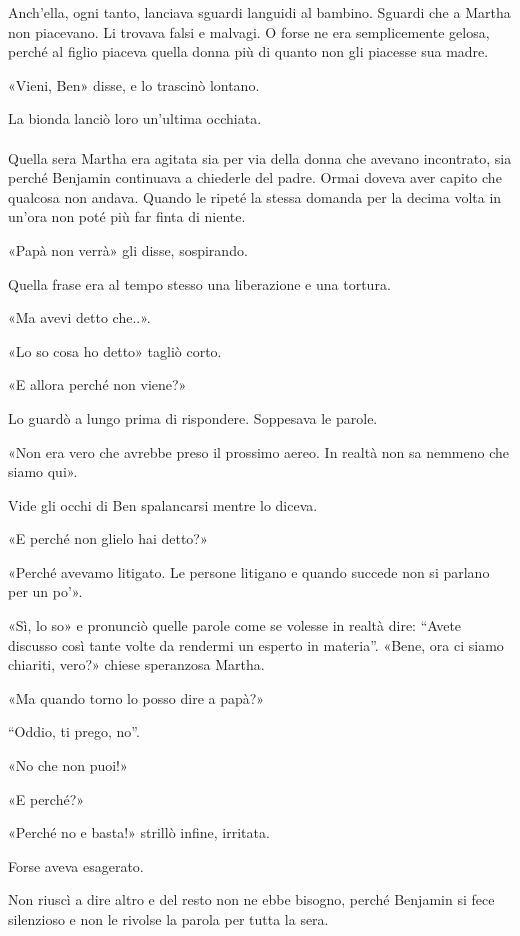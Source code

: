 \documentclass[a4paper,12pt]{book}
\begin{document}
Anch'ella, ogni tanto, lanciava sguardi languidi al bambino. Sguardi che a
Martha non piacevano. Li trovava falsi e malvagi. O forse ne era semplicemente
gelosa, perché al figlio piaceva quella donna più di quanto non gli piacesse
sua madre.

«Vieni, Ben» disse, e lo trascinò lontano.

La bionda lanciò loro un'ultima occhiata.

\paragraph{}
Quella sera Martha era agitata sia per via della donna che avevano incontrato,
sia perché Benjamin continuava a chiederle del padre. Ormai doveva aver capito
che qualcosa non andava. Quando le ripeté la stessa domanda per la decima volta
in un'ora non poté più far finta di niente.

«Papà non verrà» gli disse, sospirando.

Quella frase era al tempo stesso una liberazione e una tortura.

«Ma avevi detto che..».

«Lo so cosa ho detto» tagliò corto.

«E allora perché non viene?»

Lo guardò a lungo prima di rispondere. Soppesava le parole.

«Non era vero che avrebbe preso il prossimo aereo. In realtà non sa nemmeno
che siamo qui».

Vide gli occhi di Ben spalancarsi mentre lo diceva.

«E perché non glielo hai detto?»

«Perché avevamo litigato. Le persone litigano e quando succede non si parlano
per un po'».

«Sì, lo so» e pronunciò quelle parole come se volesse in realtà dire:
``Avete discusso così tante volte da rendermi un esperto in materia''.
«Bene, ora ci siamo chiariti, vero?» chiese speranzosa Martha.

«Ma quando torno lo posso dire a papà?»

``Oddio, ti prego, no''.

«No che non puoi!»

«E perché?»

«Perché no e basta!» strillò infine, irritata.

Forse aveva esagerato.

Non riuscì a dire altro e del resto non ne ebbe bisogno, perché Benjamin si
fece silenzioso e non le rivolse la parola per tutta la sera.
\end{document}
